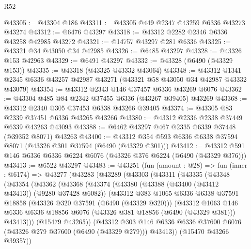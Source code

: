 \begin{lexlean}{R52}
\begin{coremodule}
@43305 := @43304 @186
@43311 := @43305 @449 @2347 @43259 @6336 @43273 @43274
@43312 := @6476 @43297
@43318 := @43312 @2282 @2346 @6336 @43258 @42985 @43272
@43321 := @14757 @43297 @281 @6336
@43325 := @43321 @34 @43050 @34 @42985
@43326 := @6485 @43297
@43328 := @43326 @153 @42963
@43329 := @6491 @43297
@43332 := @43328 (@6490 (@43329 @153))
@43335 := @43318 (@43325 @43332 @43064)
@43348 := @43312 @1341 @2345 @6336 @43257 @42987 @43271 (@43321 @58 @43050 @34 @42987 @43332 @43079)
@43354 := @43312 @2343 @146 @37457 @6336 @43269 @6076
@43362 := @43304 @485 @84 @2342 @37455 @6336 (@43267 @39405) @43269
@43368 := @43312 @2340 @305 @37453 @6338 @43266 @39405
@43374 := @43305 @83 @2339 @37451 @6336 @43265 @43266
@43380 := @43312 @2336 @2338 @37449 @6339 @43263 @43093
@43388 := @6462 @43297 @467 @2335 @6339 @37448 (@39352 @8071) @43263
@43400 := @43312 @354 @593 @6336 @6338 @37594 @8071 (@43326 @301 @37594 (@6490 (@43329 @301)))
@43412 := @43312 @591 @146 @6336 @6336 @6224 @6076 (@43326 @376 @6224 (@6490 (@43329 @376)))
@43413 := @6522 @43297
@43483 := @43251
    (fun (amount : @28) =>
    fun (inner : @6174) =>
    @43277
      (@43283
        (@43289
          (@43303
            (@43311
              (@43335
                (@43348
                  (@43354
                    (@43362
                      (@43368
                        (@43374
                          (@43380
                            (@43388 (@43400 (@43412 @43413)) (@9280 @37428 @6082))
                            (@43312
                              @383
                              @1065
                              @6336
                              @6338
                              @37591
                              @18858
                              (@43326 @320 @37591 (@6490 (@43329 @320)))
                              (@43312
                                @1063
                                @146
                                @6336
                                @6336
                                @18856
                                @6076
                                (@43326 @381 @18856 (@6490 (@43329 @381)))
                                @43413)))
                          (@15479 @43265))
                        (@43312
                          @303
                          @146
                          @6336
                          @6336
                          @37600
                          @6076
                          (@43326 @279 @37600 (@6490 (@43329 @279)))
                          @43413))
                      (@15470 @43266 @39357))

\end{coremodule}
\end{lexlean}
